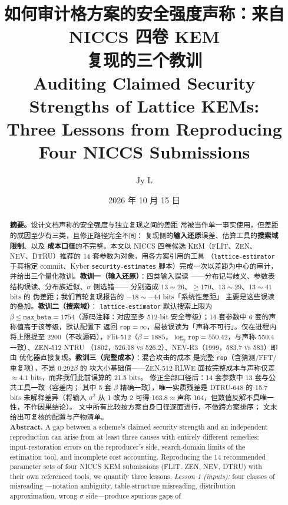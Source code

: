 \documentclass[11pt,a4paper,zihao=-4]{ctexart}
\title{\bfseries 如何审计格方案的安全强度声称：来自 NICCS 四卷 KEM\\
复现的三个教训\\[0.8em]
\large\mdseries Auditing Claimed Security Strengths of Lattice KEMs:\\
Three Lessons from Reproducing Four NICCS Submissions}
\author{Jy L}
\date{2026 年 10 月 15 日}
\newcommand{\code}[1]{\texttt{#1}}
\begin{document}
\maketitle

\begin{abstract}
\noindent\textbf{摘要。}设计文档声称的安全强度与独立复现之间的差距
常被当作单一事实使用，但差距的成因至少有三类，且修正路径完全不同：
复现侧的\textbf{输入还原}误差、估算工具的\textbf{搜索域限制}、以及
\textbf{成本口径}的不完整。本文以 NICCS 四卷候选 KEM（FLIT、ZEN、
NEV、DTRU）推荐的 14 套参数为对象，用各方案引用的工具
（\code{lattice-estimator} 于其指定 commit、Kyber
\code{security-estimates} 脚本）完成一次以差距为中心的审计，
并给出三个量化教训。\textbf{教训一（输入还原）}：四类输入误读
——分布记号歧义、参数表结构误读、分布族近似、$\sigma$ 侧选错——
分别造成 $13\sim26$、$\ge 170$、$13\sim29$、$13\sim41$ bits 的
伪差距；我们首轮复现报告的 $-18\sim-44$ bits「系统性差距」
主要是这些误读的叠加。\textbf{教训二（搜索域）}：
\code{lattice-estimator} 默认搜索上限为
$\beta \le \texttt{max\_beta}{=}1754$（源码注释：对应至多 512-bit
安全等级）；14 套参数中 6 套的声称值高于该等级，默认配置下
返回 \code{rop}$=\infty$，易被误读为「声称不可行」。仅在进程内
将上限提至 2200（不改源码），Flit-512（$\beta{=}1885$，$\log_2
\code{rop}{=}550.42$，与声称 550.4 一致）、ZEN-512 NTRU
（1802，526.18 vs 526.2）、NEV-R3（1999，583.7 vs 583）即由
优化器直接复现。\textbf{教训三（完整成本）}：混合攻击的成本
是完整 \code{rop}（含猜测/FFT/重复项），不是 $0.292\beta$ 的
块大小基础值——ZEN-512 RLWE 面按完整成本与声称仅差
$\approx 4.1$ bits，而非我们此前误算的 21.5 bits。
修正全部口径后：14 套参数中 13 套与公共工具一致（容差内；
其中 5 套 $\beta$ 精确一致），唯一实质残差是 DTRU-648 的
15.7 bits 未解释差异（将输入 $\sigma^2$ 从 1 改为 2 可得
163.8$\approx$声称 164，但数值反解不具唯一性，不作因果结论）。
文中所有比较按方案自身口径逐面进行，不做跨方案排序；
文末给出可复核的配置与产物清单。
\\[0.6em]
\noindent\textbf{Abstract.} A gap between a scheme's claimed security
strength and an independent reproduction can arise from at least
three causes with entirely different remedies: input-restoration
errors on the reproducer's side, search-domain limits of the
estimation tool, and incomplete cost accounting. Reproducing the 14
recommended parameter sets of four NICCS KEM submissions (FLIT,
ZEN, NEV, DTRU) with their own referenced tools, we quantify three
lessons. \emph{Lesson 1 (inputs):} four classes of misreading
---notation ambiguity, table-structure misreading, distribution
approximation, wrong $\sigma$ side---produce spurious gaps of

\end{abstract}
\end{document}
